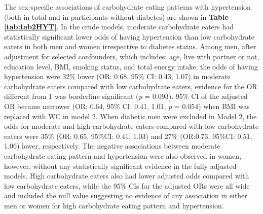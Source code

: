 The sex-specific associations of carbohydrate eating patterns with hypertension (both in total and in participants without diabetes) are shown in \textbf{Table \ref{tab:tab2HYT}}. In the crude models, moderate carbohydrate eaters had statistically significant lower odds of having hypertension than low carbohydrate eaters in both men and women irrespective to diabetes status. Among men, after adjustment for selected confounders, which includes: age, live with partner or not, education level, BMI, smoking status, and total energy intake, the odds of having hypertension were 32\% lower (OR: 0.68, 95\% CI: 0.43, 1.07) in moderate carbohydrate eaters compared with low carbohydrate eaters, evidence for the OR different from 1 was borderline significant (\textit{p} = 0.093). 95\% CI of the adjusted OR became narrower (OR: 0.64, 95\% CI: 0.41, 1.01, \textit{p} = 0.054) when BMI was replaced with WC in model 2. When diabetic men were excluded in Model 2, the odds for moderate and high carbohydrate eaters compared with low carbohydrate eaters were 35\% (OR: 0.65, 95\%CI: 0.41, 1.03) and 27\% (OR:0.73, 95\%CI: 0.51, 1.06) lower, respectively. The negative associations between moderate carbohydrate eating pattern and hypertension were also observed in women, however, without any statistically significant evidence in the fully adjusted models. High carbohydrate eaters also had lower adjusted odds compared with low carbohydrate eaters, while the 95\% CIs for the adjusted ORs were all wide and included the null value suggesting no evidence of any association in either men or women for high carbohydrate eating pattern and hypertension.

